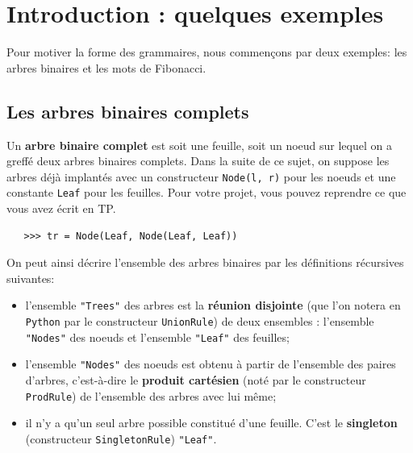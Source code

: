 \documentclass[11pt]{article}
\renewcommand{\emph}[1]{\textbf{#1}}
\newcommand{\Python}{\texttt{Python}}
\begin{document}
\maketitle
\begin{abstract}
  Le but de ce projet est d'énumérer et d'engendrer les ensembles d'objets
  combinatoires qui décrits par certaine forme de grammaire. Il est ainsi
  possible d'engendrer une grande variété d'objets comme des arbres ou des
  mots.  \medskip

  Le projet sera implanté en \Python{}. On pourra travailler seul ou en
  binôme. La date de remise sera précisée ultérieurement. Toutes les fonctions
  de ce projet devront être commentées et testées.
  \medskip

  On rédigera également un \textbf{rapport} présentant les fonctionnalités et
  répondant aux questions théoriques du sujet. Les algorithmes et choix
  d'implantations devront être expliqués.
\end{abstract}

\section{Introduction : quelques exemples}

Pour motiver la forme des grammaires, nous commençons par deux exemples: les
arbres binaires et les mots de Fibonacci.

\subsection{Les arbres binaires complets}

Un \emph{arbre binaire complet} est soit une feuille, soit un noeud sur lequel
on a greffé deux arbres binaires complets. Dans la suite de ce sujet, on
suppose les arbres déjà implantés avec un constructeur \texttt{Node(l, r)} pour
les noeuds et une constante \texttt{Leaf} pour les feuilles. Pour votre
projet, vous pouvez reprendre ce que vous avez écrit en TP.
\begin{verbatim}
   >>> tr = Node(Leaf, Node(Leaf, Leaf))
\end{verbatim}
On peut ainsi décrire l'ensemble des arbres binaires par les définitions
récursives suivantes:
\smallskip

\begin{itemize}
\item l'ensemble \texttt{"Trees"} des arbres est la \emph{réunion disjointe}
  (que l'on notera en \Python{} par le constructeur \texttt{UnionRule}) de
  deux ensembles : l'ensemble \texttt{"Nodes"} des noeuds et l'ensemble
  \texttt{"Leaf"} des feuilles;
\item l'ensemble \texttt{"Nodes"} des noeuds est obtenu à partir de l'ensemble
  des paires d'arbres, c'est-à-dire le \emph{produit cartésien} (noté par le
  constructeur \texttt{ProdRule}) de l'ensemble des arbres avec lui même;
\item il n'y a qu'un seul arbre possible constitué d'une feuille. C'est le
  \emph{singleton} (constructeur \texttt{SingletonRule}) \texttt{"Leaf"}.
\end{itemize}
\bigskip
\end{document}
